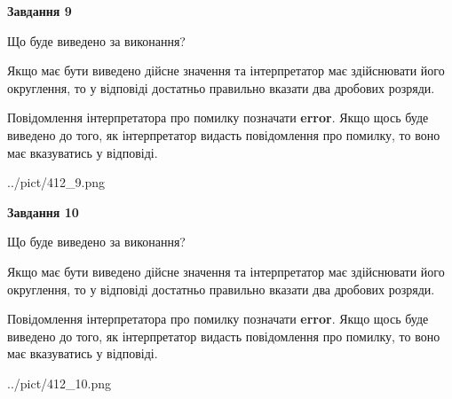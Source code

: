 \documentclass[12pt, ukrainian]{article}
\begin{document}
{\begin {Large}
{\begin {center}\textbf{Завдання 9}\end {center}}\par
Що буде виведено за виконання? \par

Якщо має бути виведено дійсне значення та інтерпретатор має здійснювати його округлення, 
то у відповіді достатньо правильно вказати два дробових розряди.

Повідомлення інтерпретатора про помилку позначати \textbf{error}.
Якщо щось буде виведено до того, як інтерпретатор видасть повідомлення про помилку, 
то воно має вказуватись у відповіді. \par

\begin{center}
	{../pict/412_9.png}
\end{center}
\newpage

{\begin {center}\textbf{Завдання 10}\end {center}}\par
Що буде виведено за виконання? \par

Якщо має бути виведено дійсне значення та інтерпретатор має здійснювати його округлення, 
то у відповіді достатньо правильно вказати два дробових розряди.

Повідомлення інтерпретатора про помилку позначати \textbf{error}.
Якщо щось буде виведено до того, як інтерпретатор видасть повідомлення про помилку, 
то воно має вказуватись у відповіді. \par

\begin{center}
	{../pict/412_10.png}
\end{center}
\newpage

\end {Large}}
\end{document}
